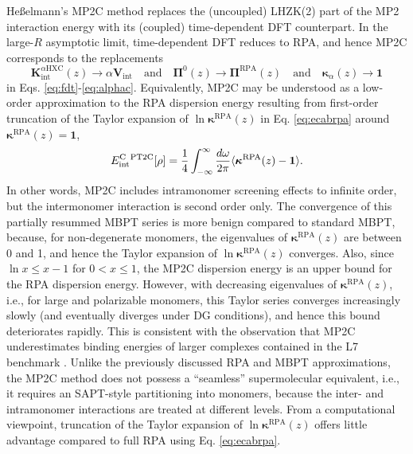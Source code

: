 \documentclass[journal=jctcce,manuscript=article]{achemso}
\begin{document}
He{\ss}elmann's MP2C method \cite{doi:10.1063/1.2905808,
  Pitonak10JChemTheoryComput6p168,doi:10.1063/1.4809981} replaces
the (uncoupled) LHZK(2) part of the MP2 interaction energy with its
(coupled) time-dependent DFT counterpart. In the large-$R$ asymptotic
limit, time-dependent DFT reduces to RPA, and hence MP2C corresponds
to the replacements 
\begin{equation}
  \label{eq:pt2cep}
\mathbf{K}^{\alpha\text{HXC}}_\text{int}(z)
\rightarrow \alpha \mathbf{V}_{\text{int}}\quad \text{and} \quad
\boldsymbol{\Pi}^0(z) 
\rightarrow \boldsymbol{\Pi}^{\text{RPA}}(z) \quad \text{and} \quad
\boldsymbol{\kappa}_{\alpha}(z) \rightarrow \mathbf{1}
\end{equation}
in Eqs. \eqref{eq:fdt}-\eqref{eq:alphac}. Equivalently, MP2C may be
understood as a low-order approximation to the RPA dispersion energy
resulting from first-order truncation of the Taylor expansion of $\ln
\boldsymbol{\kappa}^{\text{RPA}}(z)$ in Eq. \eqref{eq:ecabrpa} around
$\boldsymbol{\kappa}^{\text{RPA}}(z) = \mathbf{1}$, 
\begin{equation}
  \label{eq:ecabmp2c}
  E^{\text{C\, PT2C}}_{\text{int}}[\rho] = \frac{1}{4}
  \int_{-\infty}^{\infty} \frac{d\omega}{2\pi} \langle 
    \boldsymbol{\kappa}^{\text{RPA}}(z) - \mathbf{1} \rangle.
\end{equation}
In other words, MP2C includes intramonomer screening effects to infinite
order, but the intermonomer interaction is second order only. The
convergence of this partially resummed MBPT series is more benign
compared to standard MBPT, because, for non-degenerate monomers, the
eigenvalues of $\boldsymbol{\kappa}^{\text{RPA}}(z)$ are between 0 and
1, and hence the Taylor expansion of  $\ln
\boldsymbol{\kappa}^{\text{RPA}}(z)$ converges. Also,
since $\ln x \leq x-1$ for $0 <x \leq 1$, the MP2C dispersion energy is
an upper bound for the RPA dispersion energy. However, 
with decreasing eigenvalues of $\boldsymbol{\kappa}^{\text{RPA}}(z)$,
i.e., for large and polarizable monomers, this Taylor series converges
increasingly slowly (and eventually diverges under DG conditions), and hence
this bound deteriorates rapidly. This is consistent with the observation
that MP2C underestimates binding energies of larger complexes contained
in the L7 benchmark \cite{doi:10.1021/ct400036b}.
Unlike the previously discussed RPA and MBPT approximations,
the MP2C method does not possess a ``seamless'' supermolecular
equivalent, i.e., it requires an SAPT-style partitioning 
into monomers, because the inter- and intramonomer interactions are
treated at different levels. From a computational viewpoint, truncation
of the Taylor expansion of $\ln \boldsymbol{\kappa}^{\text{RPA}}(z)$ offers
little advantage compared to full RPA using Eq. \eqref{eq:ecabrpa}.
\end{document}
